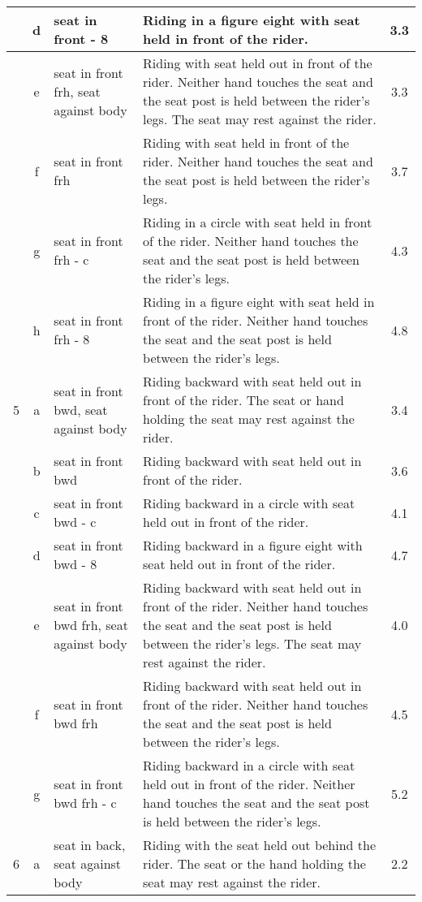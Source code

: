 \begin{longtable}{|r|c|p{4cm}|p{8cm}|c|}
\hline
  & d & seat in front - 8 & Riding in a figure eight with seat held in front of the rider.  & 3.3 \\ 
\hline
  & e & seat in front frh, seat against body  & Riding with seat held out in front of the rider. Neither hand touches the seat and the seat post is held between the rider's legs. The seat may rest against the rider. & 3.3 \\ 
\hline
  & f & seat in front frh & Riding with seat held in front of the rider. Neither hand touches the seat and the seat post is held between the rider's legs.  & 3.7 \\ 
\hline
  & g & seat in front frh - c & Riding in a circle with seat held in front of the rider. Neither hand touches the seat and the seat post is held between the rider's legs.  & 4.3 \\ 
\hline
  & h & seat in front frh - 8 & Riding in a figure eight with seat held in front of the rider. Neither hand touches the seat and the seat post is held between the rider's legs.  & 4.8 \\ 
\hline
5 & a & seat in front bwd, seat against body  & Riding backward with seat held out in front of the rider. The seat or hand holding the seat may rest against the rider. & 3.4 \\ 
\hline
  & b & seat in front bwd & Riding backward with seat held out in front of the rider. & 3.6 \\ 
\hline
  & c & seat in front bwd - c & Riding backward in a circle with seat held out in front of the rider. & 4.1 \\ 
\hline
  & d & seat in front bwd - 8 & Riding backward in a figure eight with seat held out in front of the rider. & 4.7 \\ 
\hline
  & e & seat in front bwd frh, seat against body  & Riding backward with seat held out in front of the rider. Neither hand touches the seat and the seat post is held between the rider's legs. The seat may rest against the rider.  & 4.0 \\ 
\hline
  & f & seat in front bwd frh & Riding backward with seat held out in front of the rider. Neither hand touches the seat and the seat post is held between the rider's legs. & 4.5 \\ 
\hline
  & g & seat in front bwd frh - c & Riding backward in a circle with seat held out in front of the rider. Neither hand touches the seat and the seat post is held between the rider's legs. & 5.2 \\ 
\hline
6 & a & seat in back, seat against body & Riding with the seat held out behind the rider. The seat or the hand holding the seat may rest against the rider. & 2.2 \\ 

\end{longtable}
